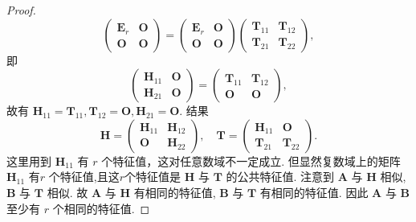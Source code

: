 \documentclass[../../main.tex]{subfiles}%
\begin{document}
\begin{proof}
\[\begin{pmatrix}
\boldsymbol{E}_r & \boldsymbol{O} \\
\boldsymbol{O} & \boldsymbol{O} 
\end{pmatrix} = \begin{pmatrix} 
\boldsymbol{E}_r & \boldsymbol{O} \\
\boldsymbol{O} & \boldsymbol{O} 
\end{pmatrix} \begin{pmatrix} 
\boldsymbol{T}_{11} & \boldsymbol{T}_{12} \\
\boldsymbol{T}_{21} & \boldsymbol{T}_{22} 
\end{pmatrix},
\]
即
\[
\begin{pmatrix} 
\boldsymbol{H}_{11} & \boldsymbol{O} \\
\boldsymbol{H}_{21} & \boldsymbol{O} 
\end{pmatrix} = \begin{pmatrix} 
\boldsymbol{T}_{11} & \boldsymbol{T}_{12} \\
\boldsymbol{O} & \boldsymbol{O} 
\end{pmatrix},
\]
故有 $\boldsymbol{H}_{11} = \boldsymbol{T}_{11}, \boldsymbol{T}_{12} = \boldsymbol{O}, \boldsymbol{H}_{21} = \boldsymbol{O}$. 结果
\[
\boldsymbol{H} = \begin{pmatrix} 
\boldsymbol{H}_{11} & \boldsymbol{H}_{12} \\
\boldsymbol{O} & \boldsymbol{H}_{22} 
\end{pmatrix}, \quad \boldsymbol{T} = \begin{pmatrix} 
\boldsymbol{H}_{11} & \boldsymbol{O} \\
\boldsymbol{T}_{21} & \boldsymbol{T}_{22} 
\end{pmatrix}.
\]
这里用到 $\boldsymbol{H}_{11}$ 有 $r$ 个特征值，这对任意数域不一定成立. 但显然复数域上的矩阵 $\boldsymbol{H}_{11}$ 有$r$ 个特征值,且这$r$个特征值是 $\boldsymbol{H}$ 与 $\boldsymbol{T}$ 的公共特征值. 注意到 $\boldsymbol{A}$ 与 $\boldsymbol{H}$ 相似, $\boldsymbol{B}$ 与 $\boldsymbol{T}$ 相似. 故 $\boldsymbol{A}$ 与 $\boldsymbol{H}$ 有相同的特征值, $\boldsymbol{B}$ 与 $\boldsymbol{T}$ 有相同的特征值. 因此 $\boldsymbol{A}$ 与 $\boldsymbol{B}$ 至少有 $r$ 个相同的特征值.
\end{proof}
\end{document}
